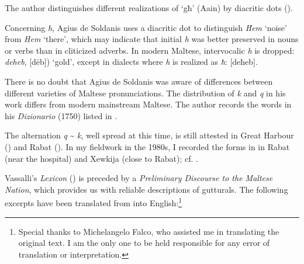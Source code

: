 \documentclass[output=paper]{langsci/langscibook}
\begin{document}
 

The author distinguishes different realizations of `għ' (Aain) 
by diacritic dots ().


\begin{table}
\caption{Realisations of `għ'}
    \label{extab:puech:6}
\end{table}

Concerning \textit{h}, Agius de Soldanis uses a diacritic dot to distinguish \textit{Ḣem} ‘noise’ from \textit{Hem} ‘there’, which may indicate that initial \textit{h} was better preserved in nouns or verbs than in cliticized adverbs. In modern Maltese, intervocalic \textit{h} is dropped: \textit{deheb}, [dēb]) ‘gold’, except in dialects where \textit{h} is realized as \textit{ħ}: [deħeb].


There is no doubt that Agius de Soldanis was aware of  differences between different varieties of Maltese pronunciations. The distribution of  \textit{k} and  \textit{q} in his work differs from modern mainstream Maltese. The author records the words in his \textit{Dizionario} (1750) listed in .

The alternation \textit{q} {\textasciitilde} \textit{k}, well spread at this time, is still attested in Great Harbour () and Rabat (). In my fieldwork in the 1980s, I recorded the forms in  in Rabat (near the hospital) and Xewkija (close to Rabat); cf. \citet{Puech1994}.





Vassalli's \textit{Lexicon} (\citeyear{Vassalli1796}) is preceded by a \textit{Preliminary Discourse to the Maltese Nation}, which provides us with reliable  descriptions of gutturals. The following excerpts have been translated from  into English:\footnote{Special thanks to Michelangelo Falco, who assisted me in translating the original text. I am the only one to be held responsible for any error of translation or interpretation.} 
\end{document}
